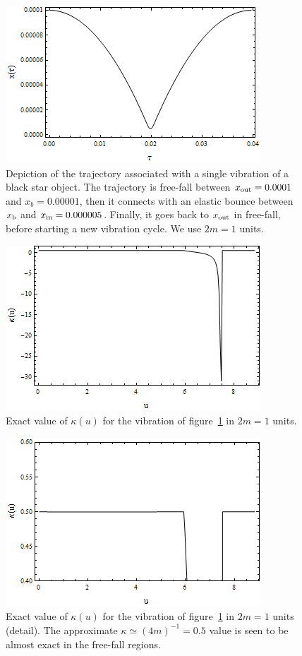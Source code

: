 \documentclass[11pt,a4paper]{article}
\begin{document}
\begin{figure}
\begin{center}
 \includegraphics[width=0.6\columnwidth]{bounce}
  \caption{Depiction of the trajectory associated with a single vibration of a black star object. The trajectory is free-fall between $x_{\rm out} = 0.0001$ and $x_b = 0.00001$, then it connects with an elastic bounce between $x_{\rm b}$ and $x_{\rm in} = 0.000005$. Finally, it goes back to $x_{\rm out}$ in free-fall, before starting a new vibration cycle. We use $2m = 1$ units.}\label{fig:bounce}
\end{center}
 \end{figure}
 
\begin{figure}
\begin{center}
 \includegraphics[width=0.6\columnwidth]{kappa}
  \caption{Exact value of $\kappa (u)$ for the vibration of figure~\ref{fig:bounce} in $2m = 1$ units.}\label{fig:kappa}
\end{center}
 \end{figure}
 
\begin{figure}
\begin{center}
 \includegraphics[width=0.6\columnwidth]{kappa-zoom}
  \caption{Exact value of $\kappa (u)$ for the vibration of figure~\ref{fig:bounce} in $2m = 1$ units (detail). The approximate $\kappa \simeq (4m)^{-1} = 0.5$ value is seen to be almost exact in the free-fall regions.}\label{fig:kappa-zoom}
\end{center}
 \end{figure}
\end{document}

